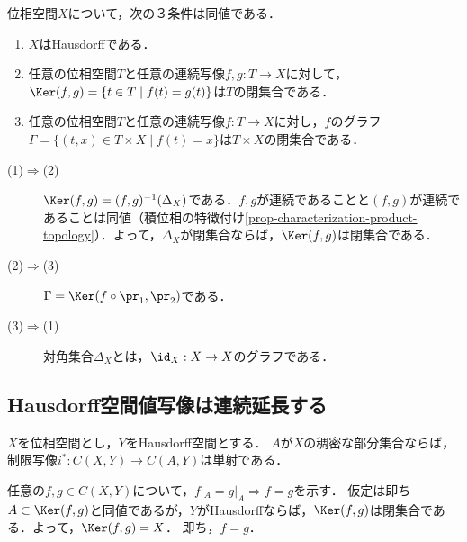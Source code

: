\documentclass[uplatex,dvipdfmx]{jsreport}
\begin{document}
\begin{proposition}\label{prop-characterization-of-Hausdorff-in-terms-of-equalizer}
    位相空間$X$について，次の３条件は同値である．
    \begin{enumerate}
        \item $X$はHausdorffである．
        \item 任意の位相空間$T$と任意の連続写像$f,g:T\to X$に対して，$\Ker(f,g)=\{t\in T\mid f(t)=g(t)\}$は$T$の閉集合である．
        \item 任意の位相空間$T$と任意の連続写像$f:T\to X$に対し，$f$のグラフ$\Gamma=\{(t,x)\in T\times X\mid f(t)=x\}$は$T\times X$の閉集合である．
    \end{enumerate}
\end{proposition}
\begin{Proof}\mbox{}
    \begin{description}
        \item[(1)$\Rightarrow$(2)] 
        $\Ker(f,g)=(f,g)^{-1}(\Delta_X)$である．$f,g$が連続であることと$(f,g)$が連続であることは同値（積位相の特徴付け\ref{prop-characterization-product-topology}）．よって，$\Delta_X$が閉集合ならば，$\Ker(f,g)$は閉集合である．
        \item[(2)$\Rightarrow$(3)] 
        $\Gamma=\Ker(f\circ\pr_1,\pr_2)$である．
        \item[(3)$\Rightarrow$(1)] 
        対角集合$\Delta_X$とは，$\id_X:X\to X$のグラフである．
    \end{description}
\end{Proof}

\subsection{Hausdorff空間値写像は連続延長する}

\begin{corollary}\label{cor-Hausdorff空間への連続写像は，稠密な部分集合への制限で一意的に定まる}
    $X$を位相空間とし，$Y$をHausdorff空間とする．
    $A$が$X$の稠密な部分集合ならば，制限写像$i^*:C(X,Y)\to C(A,Y)$は単射である．
\end{corollary}
\begin{Proof}
    任意の$f,g\in C(X,Y)$について，$f|_A=g|_A\Rightarrow f=g$を示す．
    仮定は即ち$A\subset\Ker(f,g)$と同値であるが，$Y$がHausdorffならば，$\Ker(f,g)$は閉集合である．よって，$\Ker(f,g)=X$．
    即ち，$f=g$．
\end{Proof}
\end{document}

